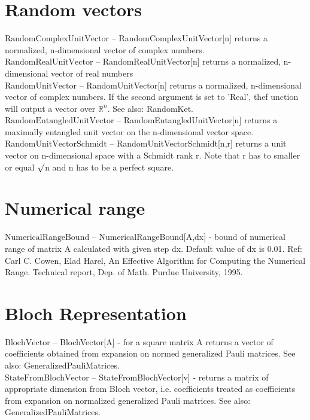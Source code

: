 \documentclass[a4paper,10pt]{scrartcl}
\begin{document}
\section{Random vectors}

\noindent\textbf{$ \text{RandomComplexUnitVector} $ }-- RandomComplexUnitVector[n] returns a normalized, n-dimensional vector of complex numbers.$  $\\[8pt]
\noindent\textbf{$ \text{RandomRealUnitVector} $ }-- RandomRealUnitVector[n] returns a normalized, n-dimensional vector of real numbers$  $\\[8pt]
\noindent\textbf{$ \text{RandomUnitVector} $ }-- RandomUnitVector[n] returns a normalized, n-dimensional vector of complex numbers. If the second argument is set to 'Real', thef unction will output a vector over $ \mathbb{R}^n $. See also: RandomKet.$  $\\[8pt]
\noindent\textbf{$ \text{RandomEntangledUnitVector} $ }-- RandomEntangledUnitVector[n] returns a maximally entangled unit vector on the n-dimensional vector space.$  $\\[8pt]
\noindent\textbf{$ \text{RandomUnitVectorSchmidt} $ }-- RandomUnitVectorSchmidt[n,r] returns a unit vector on n-dimensional space with a Schmidt rank r. Note that r has to smaller or equal $\surd $n and n has to be a perfect square.$  $\\[8pt]
\section{Numerical range}

\noindent\textbf{$ \text{NumericalRangeBound} $ }-- NumericalRangeBound[A,dx] - bound of numerical range of matrix A calculated with given step dx. Default value of dx is 0.01. Ref: Carl C. Cowen, Elad Harel, An Effective Algorithm for Computing the Numerical Range. Technical report, Dep. of Math. Purdue University, 1995.$  $\\[8pt]
\section{Bloch Representation}

\noindent\textbf{$ \text{BlochVector} $ }-- BlochVector[A] - for a square matrix A returns a vector of coefficients obtained from expansion on normed generalized Pauli matrices. See also: GeneralizedPauliMatrices.$  $\\[8pt]
\noindent\textbf{$ \text{StateFromBlochVector} $ }-- StateFromBlochVector[v] - returns a matrix of appropriate dimension from Bloch vector, i.e. coefficients treated as coefficients from expansion on normalized generalized Pauli matrices. See also: GeneralizedPauliMatrices.$  $\\[8pt]
\end{document}

